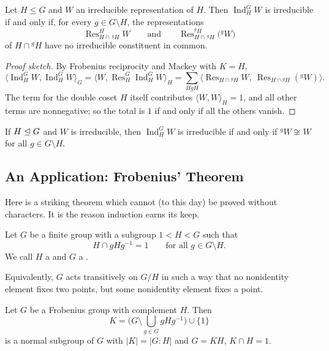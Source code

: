 \documentclass[a4paper]{scrartcl}
\newcommand{\Ind}{\operatorname{Ind}}
\newcommand{\Res}{\operatorname{Res}}
\newcommand{\ip}[2]{\langle #1, #2 \rangle}
\begin{document}
\begin{corollary}
	Let $H\leq G$ and $W$ an irreducible representation of $H$. Then $\Ind_H^GW$ is irreducible if and only if, for every $g \in G\setminus H$, the representations
	$$\Res^{H}_{H\cap\, {}^gH}W \qquad\text{and}\qquad \Res^{{}^gH}_{H\cap\, {}^gH}\big({}^gW\big)$$
	of $H\cap{}^gH$ have no irreducible constituent in common.
\end{corollary}
\begin{proof}[Proof sketch]
	By Frobenius reciprocity and Mackey with $K = H$,
	$$\ip{\Ind_H^GW}{\Ind_H^GW}_G = \ip{W}{\Res^G_H\Ind_H^GW}_H = \sum_{HgH}\big\langle \Res_{H\cap{}^gH}W,\ \Res_{H\cap{}^gH}({}^gW)\big\rangle.$$
	The term for the double coset $H$ itself contributes $\ip WW_H = 1$, and all other terms are nonnegative; so the total is $1$ if and only if all the others vanish.
\end{proof}

\begin{corollary}
	If $H\trianglelefteq G$ and $W$ is irreducible, then $\Ind_H^GW$ is irreducible if and only if ${}^gW\not\cong W$ for all $g\in G\setminus H$.
\end{corollary}

\subsection{An Application: Frobenius' Theorem}

Here is a striking theorem which cannot (to this day) be proved without characters. It is the reason induction earns its keep.

\begin{definition}
	Let $G$ be a finite group with a subgroup $1 < H < G$ such that
	$$H\cap gHg^{-1} = 1\qquad\text{for all } g\in G\setminus H.$$
	We call $H$ a  and $G$ a .
\end{definition}

Equivalently, $G$ acts transitively on $G/H$ in such a way that no nonidentity element fixes two points, but some nonidentity element fixes a point.

\begin{theorem}[Frobenius, 1901]
	Let $G$ be a Frobenius group with complement $H$. Then
	$$K = \Big(G\setminus\bigcup_{g\in G}gHg^{-1}\Big)\cup\{1\}$$
	is a normal subgroup of $G$ with $|K| = |G:H|$ and $G = KH$, $K\cap H = 1$.
\end{theorem}
\end{document}
